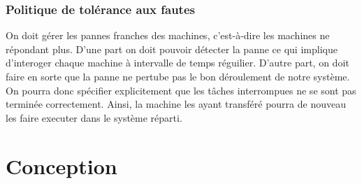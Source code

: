             

        
    \subsubsection{Politique de tolérance aux fautes}

      On doit gérer les pannes franches des machines, c'est-à-dire les
      machines ne répondant plus. D'une part on doit pouvoir détecter
      la panne ce qui implique d'interoger chaque machine à intervalle
      de temps réguilier. D'autre part, on doit faire en sorte que la
      panne ne pertube pas le bon déroulement de notre système. On
      pourra donc spécifier explicitement que les tâches interrompues
      ne se sont pas terminée correctement. Ainsi, la machine les
      ayant transféré pourra de nouveau les faire executer dans le
      système réparti.

\newpage
\section{Conception}

